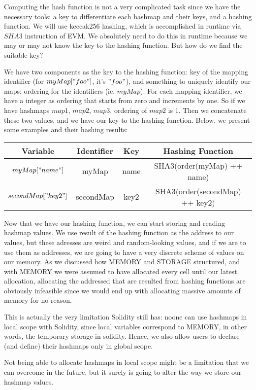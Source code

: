 \documentclass{article}
\begin{document}
\par Computing the hash function is not a very complicated task since we have the necessary tools: a key to differentiate each hashmap and their keys, and a hashing function. We will use keccak256 hashing, which is accomplished in runtime via $SHA3$ instruction of EVM. We absolutely need to do this in runtime because we may or may not know the key to the hashing function. But how do we find the suitable key?
\par We have two components as the key to the hashing function: key of the mapping identifier (for $myMap["foo"]$, it's $"foo"$), and something to uniquely identify our maps: ordering for the identifiers (ie. $myMap$). For each mapping identifier, we have a integer as ordering that starts from zero and increments by one. So if we have hashmaps $map1$, $map2$, $map3$, ordering of $map2$ is $1$. Then we concatenate these two values, and we have our key to the hashing function. Below, we present some examples and their hashing results:

\begin{center}
  \begin{tabular} { | c | c | c | c | }
    \hline
    Variable & Identifier & Key & Hashing Function \\
    \hline
    $myMap["name"]$ & myMap & name & SHA3(order(myMap) ++ name) \\
    \hline
    $secondMap["key2"]$ & secondMap & key2 & SHA3(order(secondMap) ++ key2) \\
    \hline
  \end{tabular}
\end{center}
\newpage
\par Now that we have our hashing function, we can start storing and reading hashmap values. We use result of the hashing function as the address to our values, but these adresses are weird and random-looking values, and if we are to use them as addresses, we are going to have a very discrete scheme of values on our memory. As we discussed how MEMORY and STORAGE structured, and with MEMORY we were assumed to have allocated every cell until our latest allocation, allocating the addressed that are resulted from hashing functions are obviously infeasible since we would end up with allocating massive amounts of memory for no reason.
\par This is actually the very limitation Solidity still has: noone can use hashmaps in local scope with Solidity, since local variables correspond to MEMORY, in other words, the temporary storage in solidity. Hence, we also allow users to declare (and define) their hashmaps only in global scope.
\par Not being able to allocate hashmaps in local scope might be a limitation that we can overcome in the future, but it surely is going to alter the way we store our hashmap values.
\end{document}
